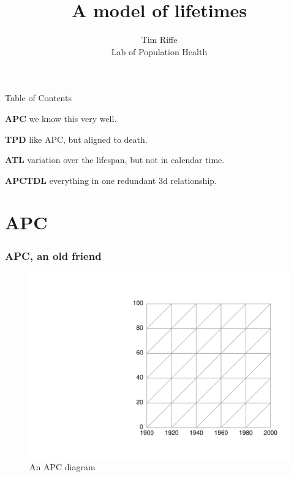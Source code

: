\documentclass[20pt]{beamer}
\title{A model of lifetimes}
\subtitle{Tim Riffe\\ Lab of Population Health}		%
\begin{document}
\begin{frame}
	\titlepage
\end{frame}


\begin{frame}{Table of Contents}
  \begin{description}
    \item<1->{\textbf{APC}} we know this very well.
    \item<2->{\textbf{TPD}} like APC, but aligned to death.
    \item<3->{\textbf{ATL}} variation over the lifespan, but not in calendar
    time.
    \item<4->{\textbf{APCTDL}} everything in one redundant 3d relationship.
  \end{description}
\end{frame}


\section{APC}
\begin{frame}
\frametitle{APC, an old friend}
\begin{figure}[b]
    \centering
    \includegraphics[scale=.9]{Figures/LabPres/APC1.pdf}
    \caption{An APC diagram}
\end{figure} 
\end{frame}
\end{document}
